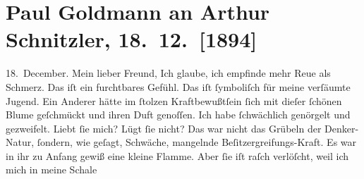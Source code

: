 

         
         \renewcommand{\erwaehntePersonen}{Personen:  ?? [Bräutigam von Hildegard Mitis], Hilda von Mitis, Maximilian von Mitis}
         \renewcommand{\erwaehnteOrte}{Orte: Bratislava, Italien, Paris, Wien}
         \renewcommand{\erwaehnteWerke}{}
               \section[Paul Goldmann an Arthur Schnitzler, 18. 12. {[}1894{]}]{ Paul Goldmann an Arthur Schnitzler, 18. 12. {[}1894{]}}\nopagebreak{}\rehead{ }\begin{ledgroupsized}[t]{13cm}\normalsize\beginnumbering \toendnotes[C]{\smallbreak\pagebreak[2]} 
\toendnotes[C]{\smallbreak}\pstart
           \raggedleft{}{\pb}18. December.\pend
           \pstart\center{}Mein lieber Freund,\pend\pstart
           Ich glaube, ich empfinde mehr Reue als Schmerz. Das iſt ein furchtbares Gefühl. Das
                  \label{K_L02628-1v}\label{K_L02628-1h} iſt ſymboliſch für meine verſäumte Jugend. Ein
               Anderer hätte im ſtolzen Kraftbewußtſein ſich mit dieſer ſchönen Blume geſchmückt und ihren Duft genoſſen. Ich
               habe ſchwächlich genörgelt und gezweifelt. Liebt ſie mich? Lügt ſie nicht? Das war
               nicht das Grübeln der Denker-Natur, ſondern, wie geſagt, Schwäche, mangelnde
               Beſitzergreifungs-Kraft. Es war in ihr zu Anfang gewiß eine kleine Flamme. Aber ſie
               iſt {\pb}raſch verlöſcht, weil ich mich in meine Schale

\end{ledgroupsized}
